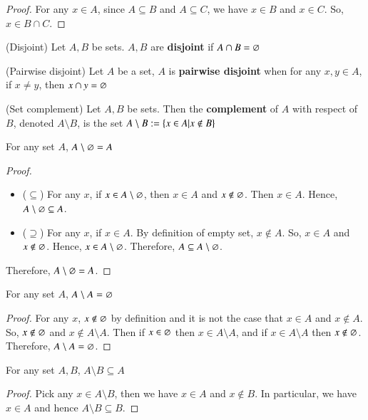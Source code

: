 \begin{proof}
    For any $x\in A$, since $A\subseteq B$ and $A\subseteq C$, we have $x\in B$ and $x\in C$. So, $x\in B\cap C$. 
\end{proof}
\begin{defn}
    (Disjoint) Let $A,B$ be sets. $A,B$ are \textbf{disjoint} if $A\cap B = \varnothing$
\end{defn}
\begin{defn}
    (Pairwise disjoint) Let $A$ be a set, $A$ is \textbf{pairwise disjoint} when for any $x,y\in A$, if $x\neq y$, then $x\cap y= \varnothing$
\end{defn}
\begin{defn}
    (Set complement) Let $A,B$ be sets. Then the \textbf{complement} of $A$ with respect of $B$, denoted $A\setminus B$, is the set $A\setminus B := \{x\in A|x\not\in B\}$
\end{defn}
\begin{defn}
    For any set $A$, $A\setminus \varnothing = A$
\end{defn}
\begin{proof}
    ~
    \begin{itemize}
        \item ($\subseteq$) For any $x$, if $x\in A\setminus \varnothing$, then $x\in A$ and $x\not\in \varnothing$. Then $x\in A$. Hence, $A\setminus \varnothing \subseteq A$.
        \item ($\supseteq$) For any $x$, if $x\in A$. By definition of empty set, $x\not\in A$. So, $x\in A$ and $x\not\in \varnothing$. Hence, $x\in A\setminus \varnothing$. Therefore, $A\subseteq A\setminus\varnothing$.
    \end{itemize}
    Therefore, $A\setminus \varnothing= A$.
\end{proof}
\begin{prop}
    For any set $A$, $A\setminus A = \varnothing$ 
\end{prop}
\begin{proof}
    For any $x$, $x\not\in\varnothing$ by definition and it is not the case that $x\in A$ and $x\not\in A$. So, $x\not\in\varnothing$ and $x\not\in A\setminus A$. Then if $x\in\varnothing$ then $x\in A\setminus A$, and if $x\in A\setminus A$ then $x\not\in \varnothing$. Therefore, $A\setminus A = \varnothing$.
\end{proof}
\begin{prop}
    For any set $A,B$, $A\setminus B \subseteq A$
\end{prop}
\begin{proof}
    Pick any $x\in A\setminus B$, then we have $x\in A$ and $x\not\in B$. In particular, we have $x\in A$ and hence $A\setminus B \subseteq B$.
\end{proof}
